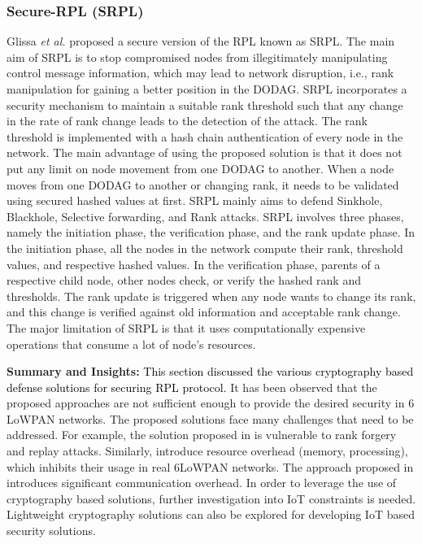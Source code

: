 \documentclass[10pt,journal,sort & compress]{IEEEtran}
\begin{document}
\subsubsection*{Secure-RPL (SRPL)}
Glissa \textit{et al.} \cite{Glissa} proposed a secure version of the RPL known as SRPL. The main aim of SRPL is to stop compromised nodes from illegitimately manipulating control message information, which may lead to network disruption, i.e., rank manipulation for gaining a better position in the DODAG. SRPL incorporates a security mechanism to maintain a suitable rank threshold such that any change in the rate of rank change leads to the detection of the attack. The rank threshold is implemented with a hash chain authentication of every node in the network. The main advantage of using the proposed solution is that it does not put any limit on node movement from one DODAG to another. When a node moves from one DODAG to another or changing rank, it needs to be validated using secured hashed values at first. SRPL mainly aims to defend Sinkhole, Blackhole, Selective forwarding, and Rank attacks. SRPL involves three phases, namely the initiation phase, the verification phase, and the rank update phase. In the initiation phase, all the nodes in the network compute their rank, threshold values, and respective hashed values. In the verification phase, parents of a respective child node, other nodes check, or verify the hashed rank and thresholds. The rank update is triggered when any node wants to change its rank, and this change is verified against old information and acceptable rank change. The major limitation of SRPL is that it uses computationally expensive operations that consume a lot of node's resources. 


\textbf{Summary and Insights:} \textcolor{black}{This section discussed the various cryptography based defense solutions for securing RPL protocol.} It has been observed that the proposed approaches are not sufficient enough to provide the desired security in $ 6 $LoWPAN networks. The proposed solutions face many challenges that need to be addressed. For example, the solution proposed in \cite{Dvir2011} is vulnerable to rank forgery and replay attacks. Similarly, \cite{landsmann2013topology, PerreyLUSW13, Taylor, Glissa} introduce resource overhead (memory, processing), which inhibits their usage in real $ 6 $LoWPAN networks. The approach proposed in \cite{khan2013wormhole} introduces significant communication overhead. In order to leverage the use of cryptography based solutions, further investigation into IoT constraints is needed. Lightweight cryptography solutions can also be explored for developing IoT based security solutions.    
\end{document}
